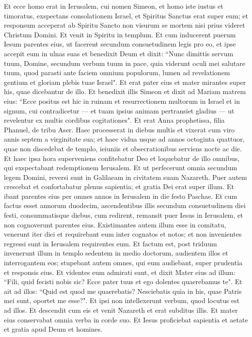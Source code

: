 \begin{biblechapter}
\verse Et ecce homo erat in Ierusalem, cui nomen Simeon, et homo iste iustus et timoratus, exspectans consolationem Israel, et Spiritus Sanctus erat super eum; 
\verse et responsum acceperat ab Spiritu Sancto non visurum se mortem nisi prius videret Christum Domini. 
\verse Et venit in Spiritu in templum. Et cum inducerent puerum Iesum parentes eius, ut facerent secundum consuetudinem legis pro eo, 
\verse et ipse accepit eum in ulnas suas et benedixit Deum et dixit: 
\verse “Nunc dimittis servum tuum, Domine, secundum verbum tuum in pace, 
\verse quia viderunt oculi mei salutare tuum, 
\verse quod parasti ante faciem omnium populorum, 
\verse lumen ad revelationem gentium et gloriam plebis tuae Israel". 
\verse Et erat pater eius et mater mirantes super his, quae dicebantur de illo.  
\verse Et benedixit illis Simeon et dixit ad Mariam matrem eius: “Ecce positus est hic in ruinam et resurrectionem multorum in Israel et in signum, cui contradicetur 
\verse — et tuam ipsius animam pertransiet gladius — ut revelentur ex multis cordibus cogitationes". 
\verse Et erat Anna prophetissa, filia Phanuel, de tribu Aser. Haec processerat in diebus multis et vixerat cum viro annis septem a virginitate sua; 
\verse et haec vidua usque ad annos octoginta quattuor, quae non discedebat de templo, ieiuniis et obsecrationibus serviens nocte ac die. 
\verse Et haec ipsa hora superveniens confitebatur Deo et loquebatur de illo omnibus, qui exspectabant redemptionem Ierusalem. 
\verse Et ut perfecerunt omnia secundum legem Domini, reversi sunt in Galilaeam in civitatem suam Nazareth. 
\verse Puer autem crescebat et confortabatur plenus sapientia; et gratia Dei erat super illum. 
\verse Et ibant parentes eius per omnes annos in Ierusalem in die festo Paschae.  
\verse Et cum factus esset annorum duodecim, ascendentibus illis secundum consuetudinem diei festi, 
\verse consummatisque diebus, cum redirent, remansit puer Iesus in Ierusalem, et non cognoverunt parentes eius. 
\verse Existimantes autem illum esse in comitatu, venerunt iter diei et requirebant eum inter cognatos et notos; 
\verse et non invenientes regressi sunt in Ierusalem requirentes eum. 
\verse Et factum est, post triduum invenerunt illum in templo sedentem in medio doctorum, audientem illos et interrogantem eos; 
\verse stupebant autem omnes, qui eum audiebant, super prudentia et responsis eius.  
\verse Et videntes eum admirati sunt, et dixit Mater eius ad illum: “Fili, quid fecisti nobis sic? Ecce pater tuus et ego dolentes quaerebamus te". 
\verse Et ait ad illos: “Quid est quod me quaerebatis? Nesciebatis quia in his, quae Patris mei sunt, oportet me esse?". 
\verse Et ipsi non intellexerunt verbum, quod locutus est ad illos. 
\verse Et descendit cum eis et venit Nazareth et erat subditus illis. Et mater eius conservabat omnia verba in corde suo. 
\verse Et Iesus proficiebat sapientia et aetate et gratia apud Deum et homines. 
\end{biblechapter}

